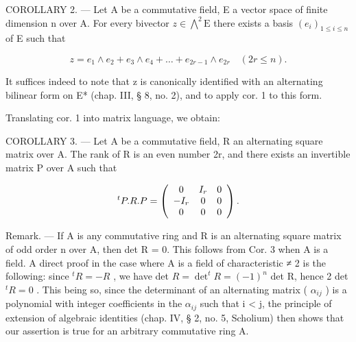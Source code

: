 COROLLARY 2. --- Let A be a commutative field, E a vector space of finite dimension n over A. For every bivector \(z \in \bigwedge^{2} \mathrm{E}\) there exists a basis \((e_i)_{1 \leqslant i \leqslant n}\) of E such that

\[
z = e _ {1} \wedge e _ {2} + e _ {3} \wedge e _ {4} + \dots + e _ {2 r - 1} \wedge e _ {2 r} \quad (2 r \leqslant n).
\]

It suffices indeed to note that z is canonically identified with an alternating bilinear form on E* (chap. III, § 8, no. 2), and to apply cor. 1 to this form.

Translating cor. 1 into matrix language, we obtain:

COROLLARY 3. --- Let A be a commutative field, R an alternating square matrix over A. The rank of R is an even number 2r, and there exists an invertible matrix P over A such that

\[
{ } ^ { t } P . R . P = \left( \begin{array} { c c c } 0 & I _ { r } & 0 \\ - I _ { r } & 0 & 0 \\ 0 & 0 & 0 \end{array} \right) .
\]

Remark. --- If A is any commutative ring and R is an alternating square matrix of odd order n over A, then det R = 0. This follows from Cor. 3 when A is a field. A direct proof in the case where A is a field of characteristic ≠ 2 is the following: since \(^tR = -R\) , we have det \(R = \det ^t R = (-1)^n\) det R, hence 2 det \(^tR = 0\) . This being so, since the determinant of an alternating matrix ( \(\alpha_{ij}\) ) is a polynomial with integer coefficients in the \(\alpha_{ij}\) such that i \textless{} j, the principle of extension of algebraic identities (chap. IV, § 2, no. 5, Scholium) then shows that our assertion is true for an arbitrary commutative ring A.

